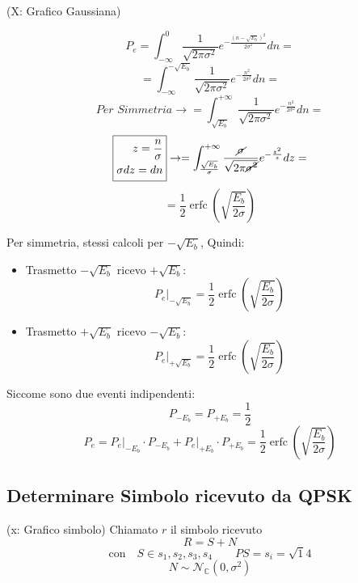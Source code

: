 \documentclass{article}
\DeclareMathOperator\erfc{erfc}
\begin{document}
\begin{minipage}{0.45\textwidth}

    (X: Grafico Gaussiana)
\end{minipage}
\begin{minipage}{0.5\textwidth}
\[ P_e = \int^0_{-\infty} \frac{1}{\sqrt{2\pi \sigma^2}} e^{-\frac{(n - \sqrt{E_b})^2}{2\sigma^2}}dn =\]
\[ = \int^{-\sqrt{E_b}}_{-\infty}\frac{1}{\sqrt{2\pi \sigma^2}} e^{-\frac{n^2}{2\sigma^2}}dn =\]
\[ \textit{Per Simmetria} \rightarrow = \int^{+\infty}_{\sqrt{E_b}}  \frac{1}{\sqrt{2\pi \sigma^2}} e^{-\frac{n^2}{2\sigma^2}}dn =\]
\[\framebox{\(\begin{split}
    z = \frac{n}{\sigma}\\
    \sigma dz = dn
    \end{split} \)} \rightarrow =
    \int^{+\infty}_{\frac{\sqrt{E_b}}{\sigma}}  \frac{\cancel{\sigma}}{\sqrt{2\pi \cancel{\sigma^2}}} e^{-\frac{z^2}{z}}dz =\]
\[ = \frac{1}{2} \erfc\left(\sqrt{\frac{E_b}{2\sigma}}\right)\]
\end{minipage}

Per simmetria, stessi calcoli per $-\sqrt{E_b}$, Quindi:
\begin{itemize}
    \item Trasmetto $-\sqrt{E_b}$ ricevo $+\sqrt{E_b}$:
        \[ P_e \big|_{-\sqrt{E_b}} = \frac{1}{2} \erfc\left(\sqrt{\frac{E_b}{2\sigma}}\right)\]
    \item Trasmetto $+\sqrt{E_b}$ ricevo $-\sqrt{E_b}$:
        \[ P_e \big|_{+\sqrt{E_b}} = \frac{1}{2} \erfc\left(\sqrt{\frac{E_b}{2\sigma}}\right)\]
\end{itemize}
Siccome sono due eventi indipendenti:
\[ P_{-E_b} = P_{+E_b} = \frac{1}{2} \]
\[ P_e = P_e \big|_{-E_b} \cdot P_{-E_b} + P_e \big|_{+E_b} \cdot P_{+E_b}= \frac{1}{2} \erfc\left(\sqrt{\frac{E_b}{2\sigma}}\right) \]


\subsection{Determinare Simbolo ricevuto da QPSK}
(x: Grafico simbolo)
Chiamato $r$ il simbolo ricevuto
\[ R = S+N \]
\[ \text{con} \quad S \in {s_1, s_2, s_3, s_4 } \qquad P{S = s_i} = \sqrt{1}{4}\]
\[ N \sim \mathcal{N}_{\mathbb{C}}(0, \sigma^2)\]
\end{document}
